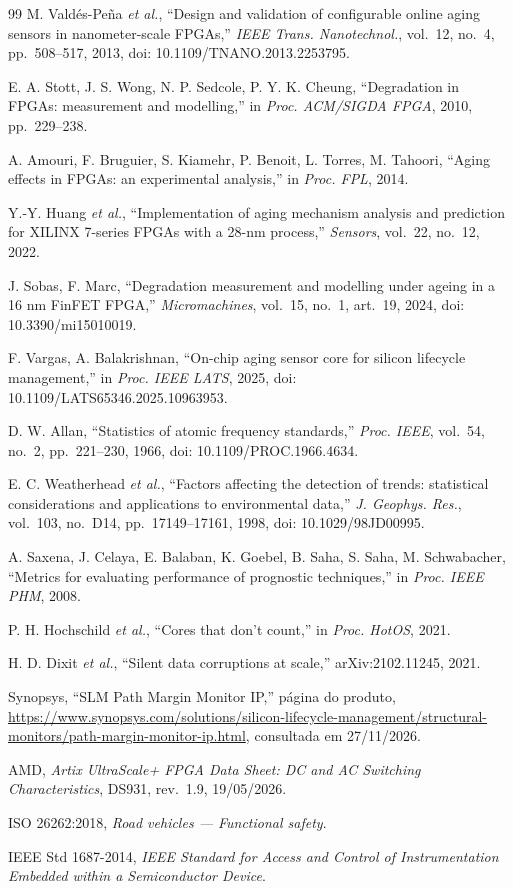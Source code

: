 \documentclass[11pt,a4paper]{article}
\begin{document}
\begin{thebibliography}{99}
 M. Valdés-Peña \emph{et al.}, ``Design and validation of configurable online aging sensors in
nanometer-scale FPGAs,'' \emph{IEEE Trans. Nanotechnol.}, vol.~12, no.~4, pp.~508--517, 2013, doi:
10.1109/TNANO.2013.2253795.

 E. A. Stott, J. S. Wong, N. P. Sedcole, P. Y. K. Cheung, ``Degradation in FPGAs: measurement
and modelling,'' in \emph{Proc. ACM/SIGDA FPGA}, 2010, pp.~229--238.

 A. Amouri, F. Bruguier, S. Kiamehr, P. Benoit, L. Torres, M. Tahoori, ``Aging effects in FPGAs: an
experimental analysis,'' in \emph{Proc. FPL}, 2014.

 Y.-Y. Huang \emph{et al.}, ``Implementation of aging mechanism analysis and prediction for XILINX
7-series FPGAs with a 28-nm process,'' \emph{Sensors}, vol.~22, no.~12, 2022.

 J. Sobas, F. Marc, ``Degradation measurement and modelling under ageing in a 16 nm FinFET FPGA,''
\emph{Micromachines}, vol.~15, no.~1, art.~19, 2024, doi: 10.3390/mi15010019.

 F. Vargas, A. Balakrishnan, ``On-chip aging sensor core for silicon lifecycle management,'' in
\emph{Proc. IEEE LATS}, 2025, doi: 10.1109/LATS65346.2025.10963953.

 D. W. Allan, ``Statistics of atomic frequency standards,'' \emph{Proc. IEEE}, vol.~54, no.~2,
pp.~221--230, 1966, doi: 10.1109/PROC.1966.4634.

 E. C. Weatherhead \emph{et al.}, ``Factors affecting the detection of trends: statistical
considerations and applications to environmental data,'' \emph{J. Geophys. Res.}, vol.~103, no.~D14, pp.~17149--17161,
1998, doi: 10.1029/98JD00995.

 A. Saxena, J. Celaya, E. Balaban, K. Goebel, B. Saha, S. Saha, M. Schwabacher, ``Metrics for
evaluating performance of prognostic techniques,'' in \emph{Proc. IEEE PHM}, 2008.

 P. H. Hochschild \emph{et al.}, ``Cores that don't count,'' in \emph{Proc. HotOS}, 2021.

 H. D. Dixit \emph{et al.}, ``Silent data corruptions at scale,'' arXiv:2102.11245, 2021.

 Synopsys, ``SLM Path Margin Monitor IP,'' página do produto,
\url{https://www.synopsys.com/solutions/silicon-lifecycle-management/structural-monitors/path-margin-monitor-ip.html},
consultada em 27/11/2026.

 AMD, \emph{Artix UltraScale+ FPGA Data Sheet: DC and AC Switching Characteristics}, DS931, rev.~1.9,
19/05/2026.

 ISO 26262:2018, \emph{Road vehicles --- Functional safety}.

 IEEE Std 1687-2014, \emph{IEEE Standard for Access and Control of Instrumentation Embedded within a
Semiconductor Device}.

\end{thebibliography}
\end{document}
